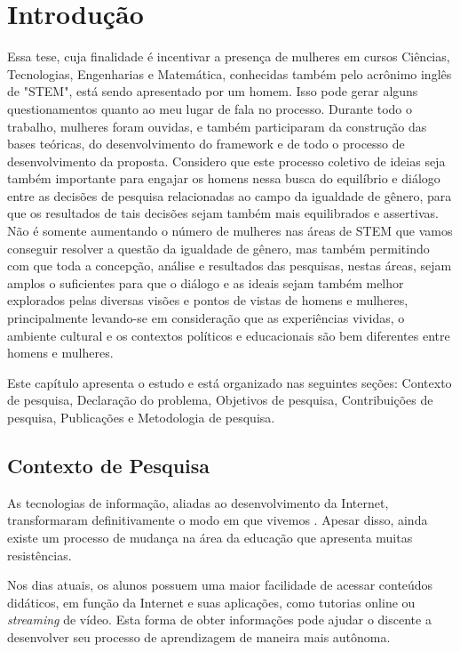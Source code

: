 \chapter{Introdução}

Essa tese, cuja finalidade é incentivar a presença de mulheres em cursos Ciências, Tecnologias, Engenharias e Matemática, conhecidas também pelo acrônimo inglês de "STEM", está sendo apresentado por um homem. Isso pode gerar alguns questionamentos quanto ao meu lugar de fala no processo. Durante todo o trabalho, mulheres foram ouvidas, e também participaram da construção das bases teóricas, do desenvolvimento do framework e de todo o processo de desenvolvimento da proposta. Considero que este processo coletivo de ideias seja também importante para engajar os homens nessa busca do equilíbrio e diálogo entre as decisões de pesquisa relacionadas ao campo da igualdade de gênero, para que os resultados de tais decisões sejam também mais equilibrados e assertivas. Não é somente aumentando o número de mulheres nas áreas de STEM que vamos conseguir resolver a questão da igualdade de gênero, mas também permitindo com que toda a concepção, análise e resultados das pesquisas, nestas áreas, sejam amplos o suficientes para que o diálogo e as ideais sejam também melhor explorados pelas diversas visões e pontos de vistas de homens e mulheres, principalmente levando-se em consideração que as experiências vividas, o ambiente cultural e os contextos políticos e educacionais são bem diferentes entre homens e mulheres.

Este capítulo apresenta o estudo e está organizado nas seguintes seções: Contexto de pesquisa, Declaração do problema, Objetivos de pesquisa, Contribuições de pesquisa, Publicações e Metodologia de pesquisa.

\section{Contexto de Pesquisa}

As tecnologias de informação, aliadas ao desenvolvimento da Internet, transformaram definitivamente o modo em que vivemos \citep{valente_tecnologia_2018}. Apesar disso, ainda existe um processo de mudança na área da educação que apresenta muitas resistências. 

Nos dias atuais, os alunos possuem uma maior facilidade de acessar conteúdos didáticos, em função da Internet e suas aplicações, como tutorias online ou \textit{streaming} de vídeo. Esta forma de obter informações pode ajudar o discente a desenvolver seu processo de aprendizagem de maneira mais autônoma.

